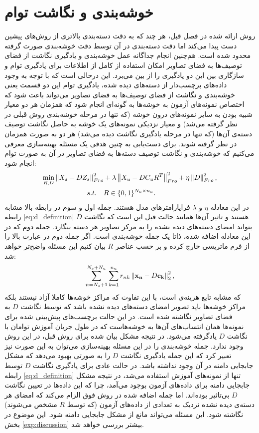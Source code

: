 \section{خوشه‌بندی و نگاشت توام} \label{jeac}
روش ارائه شده در فصل قبل، هر چند که به دقت دسته‌بندی بالاتری از روش‌های پیشین دست پیدا می‌کند اما دقت دسته‌بندی در آن توسط دقت خوشه‌بندی صورت گرفته محدود شده است. هم‌چنین انجام جداگانه عمل خوشه‌بندی و یادگیری نگاشت از فضای توصیف‌ها به فضای تصاویر امکان استفاده از کامل از اطلاعات برای یادگیری توام و سازگاری بین این دو یادگیری را از بین می‌برد. این درحالی است که با توجه به وجود داده‌های برچسب‌دار از دسته‌های دیده شده، یادگیری توام این دو قسمت یعنی خوشه‌بندی و نگاشت از فضای توصیف‌ها به فضای تصاویر می‌تواند باعث شود که اختصاص نمونه‌های آزمون به خوشه‌ها به گونه‌ای انجام شود که همزمان هر دو معیار شبیه بودن به سایر نمونه‌های درون خوشه (که تنها در مرحله خوشه‌بندی روش قبلی در نظر گرفته می‌شد) و معیار نزدیکی نمونه‌های یک خوشه به حاصل نگاشت توصیف دسته‌ی آن‌ها (که تنها در مرحله یادگیری نگاشت دیده می‌شد) هر دو به صورت همزمان در نظر گرفته شوند.
 برای دست‌یابی به چنین هدفی یک مسئله بهینه‌سازی معرفی می‌کنیم که خوشه‌بندی و نگاشت توصیف دسته‌ها به فضای تصاویر در آن به صورت توام انجام شود:
\begin{align}
\label{eq:joint}
 \min_{R,D} \left \lVert X_s - D Z_s \right \rVert_{Fro}^2  &+ \lambda \left \lVert X_u - D C_u R^T  \right \rVert_{Fro}^2 + \eta \left \lVert D \right \rVert_{Fro}^2, \\
   s.t. \quad & R \in \{0,1\}^{N_u \times n_u}. \nonumber
\end{align}
در این معادله $\eta$ و $\lambda$ فراپارامترهای مدل هستند. جمله اول و سوم در رابطه بالا مشابه رابطه \eqref{eq:d_definition} هستند و تاثیر آن‌ها همانند حالت قبل این است که نگاشت $D$ بتواند امضای دسته‌های دیده نشده را به مرکز تصاویر هر دسته بنگارد. جمله دوم که در این معادله اضافه شده، ذاتا یک جمله خوشه‌بندی است. اگر جمله دوم در عبارت بالا را از فرم ماتریسی خارج کرده و بر حسب عناصر $R$ بیان کنیم این مسئله واضح‌تر  خواهد شد:
\begin{equation}
\label{eq:essentialy_clustering}
\sum_{n=N_s+1}^{N_s + N_u} \sum_{k=1}^{n_u} r_{nk} \left \lVert \mathbf{x_n} - D \mathbf{c_k} \right \rVert_2^2,
\end{equation}
که مشابه تابع هزینه‌ی
است، با این تفاوت که مراکز خوشه‌ها کاملا آزاد نیستند بلکه مراکز خوشه‌ها باید تصویر امضای دسته‌های دیده نشده باشد که توسط نگاشت $D$ به فضای تصاویر نگاشته شده است. در این حالت برچسب‌های پیش‌بینی شده برای نمونه‌ها همان انتساب‌های آن‌ها به خوشه‌هاست که در طول جریان آموزش توامان با نگاشت $D$ یادگرفته می‌شود. در نتیجه مشکل بیان شده برای روش قبل، در این روش وجود ندارد. جمله خوشه‌بندی را در این مسئله بهینه‌سازی می‌توان به این صورت نیز تعبیر کرد که این جمله یادگیری نگاشت $D$ را به صورتی بهبود می‌دهد که مشکل جابجایی دامنه در آن وجود نداشته باشد. در حالت عادی برای یادگیری نگاشت $D$ توسط رابطه
\eqref{eq:d_definition}
تنها از نمونه‌های آموزش استفاده می‌شد، در نتیجه مشکل جابجایی دامنه برای داده‌های آزمون بوجود می‌آمد، چرا که این داده‌ها در تعیین نگاشت $D$ بی‌تاثیر بوده‌اند. اما جمله اضافه شده در روش فوق الزام می‌کند که امضای هر دسته‌ی دیده نشده نزدیک به تعدادی از داده‌های آزمون (که توسط $R$ مشخص می‌شوند) نگاشته شود. این مسئله می‌تواند مانع از مشکل جابجایی دامنه شود. این موضوع در بخش
\ref{exp:discussion}
بیشتر بررسی خواهد شد.
